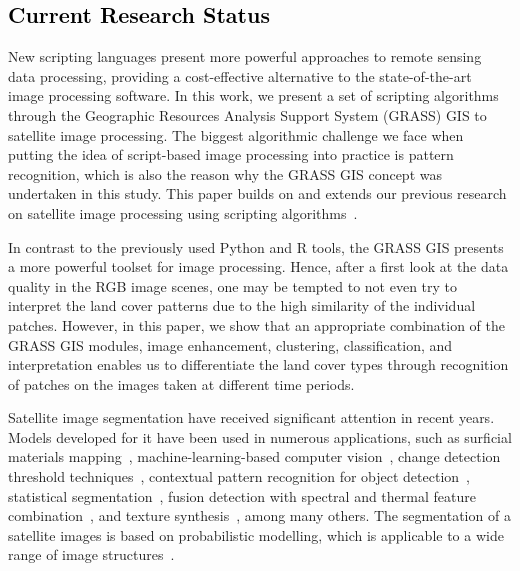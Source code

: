 \documentclass[analytics,article,accept,pdftex,moreauthors]{Definitions/mdpi}
\begin{document}
\subsection{\textcolor{black}{Current Research Status}}

{New scripting languages present more powerful approaches to remote sensing data processing, providing a cost-effective alternative to the state-of-the-art image processing software. In this work, we present a set of scripting algorithms through the Geographic Resources Analysis Support System (GRASS) GIS to satellite image processing. The biggest algorithmic challenge we face when putting the idea of script-based image processing into practice is pattern recognition, which is also the reason why the GRASS GIS concept was undertaken in this study. This paper builds on and extends our previous research on satellite image processing using scripting algorithms}~\cite{Lemenkova202227,Lemenkova202310}. 

{In contrast to the previously used Python and R tools, the GRASS GIS presents a more powerful toolset for image processing. %
Hence, after a first look at the data quality in the RGB image scenes, one may be tempted to not even try to interpret the land cover patterns due to the high similarity of the individual patches. However, in this paper, we show that an appropriate combination of the GRASS GIS modules, image enhancement, clustering, classification, and interpretation enables us to differentiate the land cover types through recognition of patches on the images taken at different time periods. }


Satellite image segmentation have received significant attention in recent years. Models developed for it have been used in numerous applications, such as surficial materials mapping~\cite{6947039}, machine-learning-based computer vision~\cite{8914551}, change detection threshold techniques~\cite{6005084}, contextual pattern recognition for object detection~\cite{10006917,9719051,4284070}, statistical segmentation~\cite{7730056,7877513}, fusion detection with spectral and thermal feature combination~\cite{7730710}, and texture synthesis~\cite{576322}, among many others.
The segmentation of a satellite images is based on  probabilistic modelling, which is applicable to a wide range of image structures~\cite{Buscombe}.  %
\end{document}
